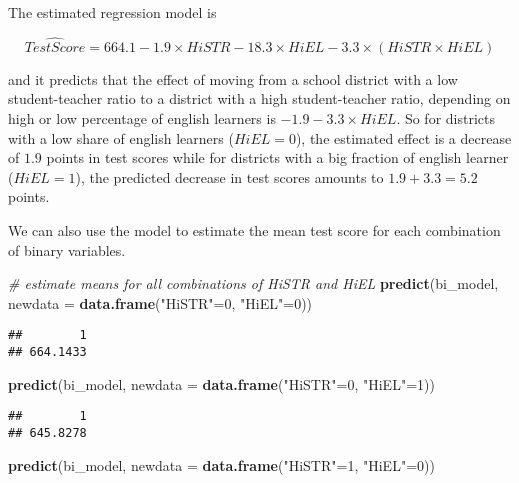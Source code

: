 \documentclass[]{book}
\newenvironment{Shaded}{\begin{snugshade}}{\end{snugshade}}
\newcommand{\KeywordTok}[1]{\textcolor[rgb]{0.13,0.29,0.53}{\textbf{#1}}}
\newcommand{\DataTypeTok}[1]{\textcolor[rgb]{0.13,0.29,0.53}{#1}}
\newcommand{\DecValTok}[1]{\textcolor[rgb]{0.00,0.00,0.81}{#1}}
\newcommand{\StringTok}[1]{\textcolor[rgb]{0.31,0.60,0.02}{#1}}
\newcommand{\CommentTok}[1]{\textcolor[rgb]{0.56,0.35,0.01}{\textit{#1}}}
\newcommand{\NormalTok}[1]{#1}
\theoremstyle{definition}
\theoremstyle{definition}
\theoremstyle{definition}
\theoremstyle{remark}
\begin{document}
The estimated regression model is

\[ \widehat{TestScore} = 664.1 - 1.9 \times HiSTR - 18.3 \times HiEL - 3.3 \times (HiSTR \times HiEL) \]

and it predicts that the effect of moving from a school district with a
low student-teacher ratio to a district with a high student-teacher
ratio, depending on high or low percentage of english learners is
\(-1.9-3.3\times HiEL\). So for districts with a low share of english
learners (\(HiEL = 0\)), the estimated effect is a decrease of \(1.9\)
points in test scores while for districts with a big fraction of english
learner (\(HiEL = 1\)), the predicted decrease in test scores amounts to
\(1.9 + 3.3 = 5.2\) points.

We can also use the model to estimate the mean test score for each
combination of binary variables.

\begin{Shaded}
\begin{Highlighting}[]
\CommentTok{# estimate means for all combinations of HiSTR and HiEL}
\KeywordTok{predict}\NormalTok{(bi_model, }\DataTypeTok{newdata =} \KeywordTok{data.frame}\NormalTok{(}\StringTok{"HiSTR"}\NormalTok{=}\DecValTok{0}\NormalTok{, }\StringTok{"HiEL"}\NormalTok{=}\DecValTok{0}\NormalTok{))}
\end{Highlighting}
\end{Shaded}

\begin{verbatim}
##        1 
## 664.1433
\end{verbatim}

\begin{Shaded}
\begin{Highlighting}[]
\KeywordTok{predict}\NormalTok{(bi_model, }\DataTypeTok{newdata =} \KeywordTok{data.frame}\NormalTok{(}\StringTok{"HiSTR"}\NormalTok{=}\DecValTok{0}\NormalTok{, }\StringTok{"HiEL"}\NormalTok{=}\DecValTok{1}\NormalTok{))}
\end{Highlighting}
\end{Shaded}

\begin{verbatim}
##        1 
## 645.8278
\end{verbatim}

\begin{Shaded}
\begin{Highlighting}[]
\KeywordTok{predict}\NormalTok{(bi_model, }\DataTypeTok{newdata =} \KeywordTok{data.frame}\NormalTok{(}\StringTok{"HiSTR"}\NormalTok{=}\DecValTok{1}\NormalTok{, }\StringTok{"HiEL"}\NormalTok{=}\DecValTok{0}\NormalTok{))}
\end{Highlighting}
\end{Shaded}
\end{document}

